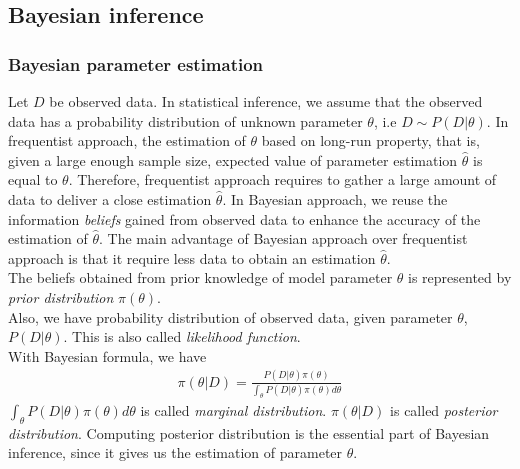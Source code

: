 \documentclass[12pt]{article}
\theoremstyle{definition}
\begin{document}
\subsection{Bayesian inference}
\subsubsection{Bayesian parameter estimation}
Let $D$ be observed data. In statistical inference, we assume that the observed
data has a probability distribution of unknown parameter $\theta$, i.e
$D \sim P(D|\theta)$. In frequentist approach, the estimation
of $\theta$ based on long-run property, that is, given a large enough sample
size, expected value of parameter estimation $\hat{\theta}$ is equal to
$\theta$. Therefore, frequentist approach requires to gather a large amount of
data to deliver a close estimation $\hat{\theta}$. In Bayesian approach, we
reuse the information \textit{beliefs} gained from observed data to enhance the
accuracy of the estimation of $\hat{\theta}$. The main advantage of Bayesian
approach over frequentist approach is that it require less data to obtain an
estimation $\hat{\theta}$.\\
The beliefs obtained from prior knowledge of model parameter $\theta$ is
represented by \textit{prior
  distribution} $\pi(\theta)$.\\
Also, we have probability distribution of observed data, given parameter
$\theta$, $P(D|\theta)$. This is also called \textit{likelihood function}.\\
With Bayesian formula, we have
\begin{align*}
  \pi(\theta | D) = \frac{P(D|\theta)\pi(\theta)}{\int_\theta P(D|\theta)\pi(\theta)d\theta}
\end{align*}
$\int_\theta P(D|\theta)\pi(\theta)d\theta$ is called \textit{marginal
  distribution}. $\pi(\theta | D)$ is called \textit{posterior distribution}.
Computing posterior distribution is the essential part of Bayesian inference,
since it gives us the estimation of parameter $\theta$.
\end{document}
